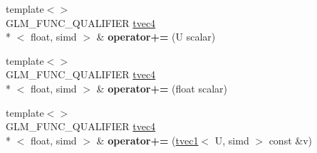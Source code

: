 \begin{DoxyCompactItemize}
\item 
\hypertarget{structglm_1_1tvec4_a8517a66427b7c355f5e14de1da7d20c6}{{\footnotesize template$<$$>$ }\\G\-L\-M\-\_\-\-F\-U\-N\-C\-\_\-\-Q\-U\-A\-L\-I\-F\-I\-E\-R \hyperlink{structglm_1_1tvec4}{tvec4}\\*
$<$ float, simd $>$ \& {\bfseries operator+=} (U scalar)}\label{structglm_1_1tvec4_a8517a66427b7c355f5e14de1da7d20c6}

\item 
\hypertarget{structglm_1_1tvec4_abcce0cf43fffb97306b0e2a48c9ce4f4}{{\footnotesize template$<$$>$ }\\G\-L\-M\-\_\-\-F\-U\-N\-C\-\_\-\-Q\-U\-A\-L\-I\-F\-I\-E\-R \hyperlink{structglm_1_1tvec4}{tvec4}\\*
$<$ float, simd $>$ \& {\bfseries operator+=} (float scalar)}\label{structglm_1_1tvec4_abcce0cf43fffb97306b0e2a48c9ce4f4}

\item 
\hypertarget{structglm_1_1tvec4_a47edaf9faf27109cd7cf51f5bcc50f72}{{\footnotesize template$<$$>$ }\\G\-L\-M\-\_\-\-F\-U\-N\-C\-\_\-\-Q\-U\-A\-L\-I\-F\-I\-E\-R \hyperlink{structglm_1_1tvec4}{tvec4}\\*
$<$ float, simd $>$ \& {\bfseries operator+=} (\hyperlink{structglm_1_1tvec1}{tvec1}$<$ U, simd $>$ const \&v)}\label{structglm_1_1tvec4_a47edaf9faf27109cd7cf51f5bcc50f72}

\end{DoxyCompactItemize}
